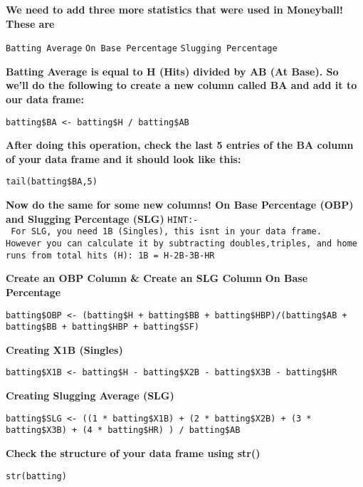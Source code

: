 \documentclass[
]{article}
\begin{document}
\textbf{We need to add three more statistics that were used in
Moneyball! These are}

\texttt{Batting\ Average} \texttt{On\ Base\ Percentage}
\texttt{Slugging\ Percentage}

\textbf{Batting Average is equal to H (Hits) divided by AB (At Base). So
we'll do the following to create a new column called BA and add it to
our data frame:}

\begin{verbatim}
batting$BA <- batting$H / batting$AB
\end{verbatim}

\textbf{After doing this operation, check the last 5 entries of the BA
column of your data frame and it should look like this:}

\begin{verbatim}
tail(batting$BA,5)
\end{verbatim}

\textbf{Now do the same for some new columns! On Base Percentage (OBP)
and Slugging Percentage (SLG)}
\texttt{HINT:-\ For\ SLG,\ you\ need\ 1B\ (Singles),\ this\ isn\textquotesingle{}t\ in\ your\ data\ frame.}
\texttt{However\ you\ can\ calculate\ it\ by\ subtracting\ doubles,triples,\ and\ home\ runs\ from\ total\ hits\ (H):\ 1B\ =\ H-2B-3B-HR}

\textbf{Create an OBP Column \& Create an SLG Column} \textbf{On Base
Percentage}

\begin{verbatim}
batting$OBP <- (batting$H + batting$BB + batting$HBP)/(batting$AB + batting$BB + batting$HBP + batting$SF)
\end{verbatim}

\textbf{Creating X1B (Singles)}

\begin{verbatim}
batting$X1B <- batting$H - batting$X2B - batting$X3B - batting$HR
\end{verbatim}

\textbf{Creating Slugging Average (SLG)}

\begin{verbatim}
batting$SLG <- ((1 * batting$X1B) + (2 * batting$X2B) + (3 * batting$X3B) + (4 * batting$HR) ) / batting$AB
\end{verbatim}

\textbf{Check the structure of your data frame using str()}

\begin{verbatim}
str(batting)
\end{verbatim}
\end{document}
